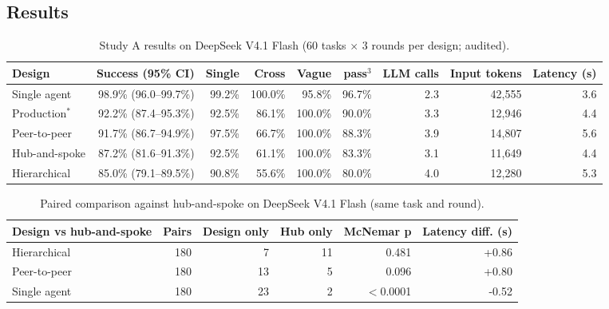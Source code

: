 \documentclass[11pt,a4paper]{article}
\begin{document}
\subsection{Results}
\begin{table}[H]
\centering
\footnotesize
\caption{Study A results on DeepSeek V4.1 Flash (60 tasks $\times$ 3 rounds per design; audited).}\label{tab:a-ds}
\begin{tabular}{lrrrrrrrr}
\toprule
\textbf{Design} & \textbf{Success (95\% CI)} & \textbf{Single} & \textbf{Cross} & \textbf{Vague} & \textbf{pass$^{3}$} & \textbf{LLM calls} & \textbf{Input tokens} & \textbf{Latency (s)} \\
\midrule
Single agent & 98.9\% (96.0--99.7\%) & 99.2\% & 100.0\% & 95.8\% & 96.7\% & 2.3 & 42,555 & 3.6 \\
Production$^{*}$ & 92.2\% (87.4--95.3\%) & 92.5\% & 86.1\% & 100.0\% & 90.0\% & 3.3 & 12,946 & 4.4 \\
Peer-to-peer & 91.7\% (86.7--94.9\%) & 97.5\% & 66.7\% & 100.0\% & 88.3\% & 3.9 & 14,807 & 5.6 \\
Hub-and-spoke & 87.2\% (81.6--91.3\%) & 92.5\% & 61.1\% & 100.0\% & 83.3\% & 3.1 & 11,649 & 4.4 \\
Hierarchical & 85.0\% (79.1--89.5\%) & 90.8\% & 55.6\% & 100.0\% & 80.0\% & 4.0 & 12,280 & 5.3 \\
\bottomrule
\end{tabular}
\end{table}


\begin{table}[H]
\centering
\small
\caption{Paired comparison against hub-and-spoke on DeepSeek V4.1 Flash (same task and round).}\label{tab:a-cmp-ds}
\begin{tabular}{lrrrrr}
\toprule
\textbf{Design vs hub-and-spoke} & \textbf{Pairs} & \textbf{Design only} & \textbf{Hub only} & \textbf{McNemar p} & \textbf{Latency diff. (s)} \\
\midrule
Hierarchical & 180 & 7 & 11 & 0.481 & +0.86 \\
Peer-to-peer & 180 & 13 & 5 & 0.096 & +0.80 \\
Single agent & 180 & 23 & 2 & $<$0.0001 & -0.52 \\
\bottomrule
\end{tabular}
\end{table}
\end{document}
